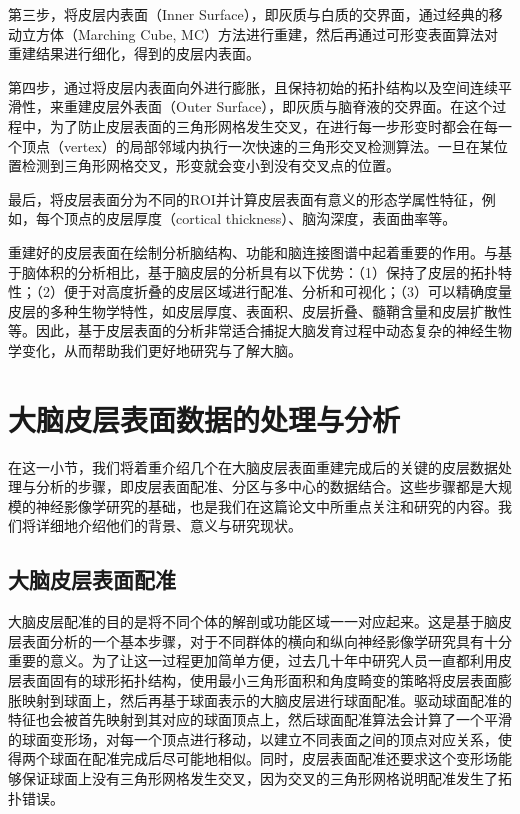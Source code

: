第三步，将皮层内表面（Inner Surface），即灰质与白质的交界面，通过经典的移动立方体（Marching Cube, MC）方法\cite{lorensen1987marching}进行重建，然后再通过可形变表面算法对重建结果进行细化，得到的皮层内表面。

第四步，通过将皮层内表面向外进行膨胀，且保持初始的拓扑结构以及空间连续平滑性，来重建皮层外表面（Outer Surface），即灰质与脑脊液的交界面。在这个过程中，为了防止皮层表面的三角形网格发生交叉，在进行每一步形变时都会在每一个顶点（vertex）的局部邻域内执行一次快速的三角形交叉检测算法。一旦在某位置检测到三角形网格交叉，形变就会变小到没有交叉点的位置。

最后，将皮层表面分为不同的ROI并计算皮层表面有意义的形态学属性特征，例如，每个顶点的皮层厚度（cortical thickness）、脑沟深度，表面曲率等\cite{li2014mapping}。

重建好的皮层表面在绘制分析脑结构、功能和脑连接图谱中起着重要的作用。与基于脑体积的分析相比，基于脑皮层的分析具有以下优势：（1）保持了皮层的拓扑特性；（2）便于对高度折叠的皮层区域进行配准、分析和可视化；（3）可以精确度量皮层的多种生物学特性，如皮层厚度、表面积、皮层折叠、髓鞘含量和皮层扩散性等。因此，基于皮层表面的分析非常适合捕捉大脑发育过程中动态复杂的神经生物学变化，从而帮助我们更好地研究与了解大脑。


\section{大脑皮层表面数据的处理与分析}
在这一小节，我们将着重介绍几个在大脑皮层表面重建完成后的关键的皮层数据处理与分析的步骤，即皮层表面配准、分区与多中心的数据结合。这些步骤都是大规模的神经影像学研究的基础，也是我们在这篇论文中所重点关注和研究的内容。我们将详细地介绍他们的背景、意义与研究现状。

\subsection{大脑皮层表面配准}\label{sec:大脑皮层表面配准}
大脑皮层配准的目的是将不同个体的解剖或功能区域一一对应起来。这是基于脑皮层表面分析的一个基本步骤，对于不同群体的横向和纵向神经影像学研究具有十分重要的意义。为了让这一过程更加简单方便，过去几十年中研究人员一直都利用皮层表面固有的球形拓扑结构，使用最小三角形面积和角度畸变的策略将皮层表面膨胀映射到球面上\cite{fischl1999cortical,fischl1999high}，然后再基于球面表示的大脑皮层进行球面配准\cite{yeo2009spherical,robinson2014msm}。驱动球面配准的特征也会被首先映射到其对应的球面顶点上，然后球面配准算法会计算了一个平滑的球面变形场，对每一个顶点进行移动，以建立不同表面之间的顶点对应关系，使得两个球面在配准完成后尽可能地相似。同时，皮层表面配准还要求这个变形场能够保证球面上没有三角形网格发生交叉\cite{moller1997fast}，因为交叉的三角形网格说明配准发生了拓扑错误。


